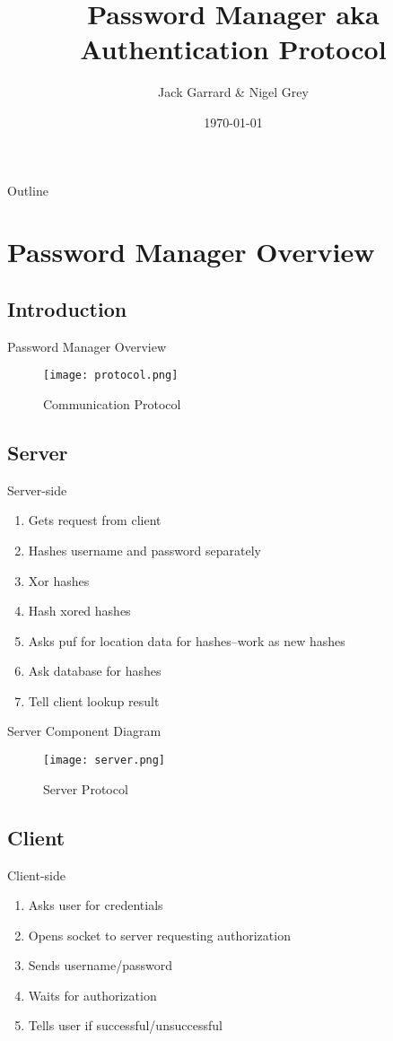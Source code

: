 \documentclass[presentation]{beamer}
\author{Jack Garrard \& Nigel Grey}
\date{\today}
\title{Password Manager aka Authentication Protocol}
\begin{document}
\maketitle
\begin{frame}{Outline}
  \tableofcontents
\end{frame}
\section{Password Manager Overview}
\subsection{Introduction}
\begin{frame}{Password Manager Overview}
  \begin{figure}[h]
    \centering
    \texttt{[image: protocol.png]}
    \caption{Communication Protocol}
  \end{figure}
\end{frame}
\subsection{Server}
\begin{frame}{Server-side}
  \begin{enumerate}
    \item Gets request from client
      \pause
    \item Hashes username and password separately
      \pause
    \item Xor hashes
      \pause
    \item Hash xored hashes
      \pause
    \item Asks puf for location data for hashes--work as new hashes
      \pause
    \item Ask database for hashes
      \pause
    \item Tell client lookup result
  \end{enumerate}
\end{frame}
\begin{frame}{Server Component Diagram}
  \begin{figure}[h]
    \centering
    \texttt{[image: server.png]}
    \caption{Server Protocol}
  \end{figure}
\end{frame}
\subsection{Client}
\begin{frame}{Client-side}
  \begin{enumerate}
    \item Asks user for credentials
      \pause
    \item Opens socket to server requesting authorization
      \pause
    \item Sends username/password
      \pause
    \item Waits for authorization
      \pause
    \item Tells user if successful/unsuccessful
  \end{enumerate}
\end{frame}
\end{document}
